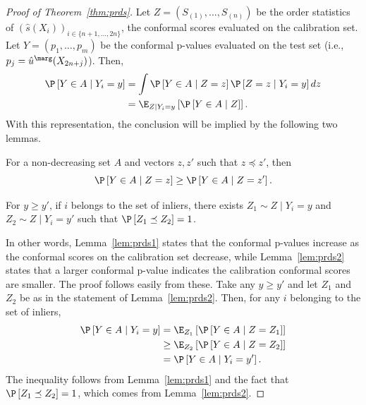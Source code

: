 \begin{proof}[Proof of Theorem~\ref{thm:prds}]
Let $Z = (S_{(1)},\dots,S_{(n)})$ be the order statistics of $(\hat{s}(X_i))_{i \in \{n+1,\dots,2n\}}$, the conformal scores evaluated on the calibration set.  Let $Y = (p_1,\dots,p_m)$ be the conformal p-values evaluated on the test set (i.e., $p_j = \hat{u}^\marg(X_{2n+j})$). Then,
\begin{align*}
    \P\left[ Y \in A \mid Y_i = y \right] &= \int \P\left[ Y \in A \mid Z = z\right] \P\left[Z = z \mid Y_i = y\right] dz \\
    &= \E_{Z \mid Y_i = y}\left[ \P\left[ Y \in A \mid Z\right] \right].
\end{align*}
With this representation, the conclusion will be implied by the following two lemmas.

\begin{lemma} \label{lem:prds1}
For a non-decreasing set $A$ and vectors $z, z'$ such that $z \preceq z'$, then
\begin{equation*}
    \P\left[ Y \in A \mid Z = z \right] \ge \P \left[ Y \in A \mid Z = z' \right].
\end{equation*}
\end{lemma}

\begin{lemma} \label{lem:prds2}
For $y \ge y'$, if $i$ belongs to the set of inliers, there exists $Z_1 \sim Z \mid Y_i = y$ and $Z_2 \sim Z \mid Y_i = y'$ such that $\P\left[Z_1 \preceq Z_2\right] = 1$.
\end{lemma}

In other words, Lemma~\ref{lem:prds1} states that the conformal p-values increase as the conformal scores on the calibration set decrease, while Lemma~\ref{lem:prds2} states that a larger conformal p-value indicates the calibration conformal scores are smaller.
The proof follows easily from these. Take any $y \ge y'$ and let $Z_1$ and $Z_2$ be as in the statement of Lemma~\ref{lem:prds2}. Then, for any $i$ belonging to the set of inliers,
\begin{align*}
\P\left[ Y \in A \mid Y_i = y \right]
    &= \E_{Z_1}\left[\P\left[ Y \in A \mid Z = Z_1\right] \right] \\
    &\ge \E_{Z_2}\left[\P\left[ Y \in A \mid Z = Z_2 \right] \right] \\
    &= \P\left[Y \in A \mid Y_i = y'\right].
\end{align*}
The inequality follows from Lemma~\ref{lem:prds1} and the fact that $\P\left[ Z_1 \preceq Z_2 \right] = 1$, which comes from Lemma~\ref{lem:prds2}.
\end{proof}

